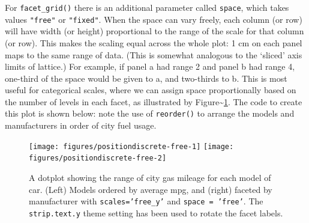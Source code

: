 For \texttt{facet\_grid()} there is an additional parameter called
\texttt{space}, which takes values \texttt{"free"} or \texttt{"fixed"}.
When the space can vary freely, each column (or row) will have width (or
height) proportional to the range of the scale for that column (or row).
This makes the scaling equal across the whole plot: 1 cm on each panel
maps to the same range of data. (This is somewhat analogous to the
`sliced' axis limits of lattice.) For example, if panel a had range 2
and panel b had range 4, one-third of the space would be given to a, and
two-thirds to b. This is most useful for categorical scales, where we
can assign space proportionally based on the number of levels in each
facet, as illustrated by Figure\textasciitilde{}\ref{fig:discrete-free}.
The code to create this plot is shown below: note the use of
\texttt{reorder()} to arrange the models and manufacturers in order of
city fuel usage. 

\begin{Shaded}
\begin{Highlighting}[]
\StringTok{ }
  \StringTok{ }
  \StringTok{ }
\NormalTok{\})}
\StringTok{ } 

\StringTok{ }\StringTok{ } \NormalTok{, }
   \NormalTok{) +}\StringTok{ }\NormalTok{(} \NormalTok{(} \NormalTok{))}
\end{Highlighting}
\end{Shaded}

\begin{figure}
\texttt{[image: figures/positiondiscrete-free-1]} \texttt{[image: figures/positiondiscrete-free-2]} \caption{A dotplot showing the range of city gas mileage for each model of car. (Left) Models ordered by average mpg, and (right) faceted by manufacturer with \texttt{scales='free\_y'} and \texttt{space = 'free'}. The \texttt{strip.text.y} theme setting has been used to rotate the facet labels.\label{fig:discrete-free}}
\end{figure}


